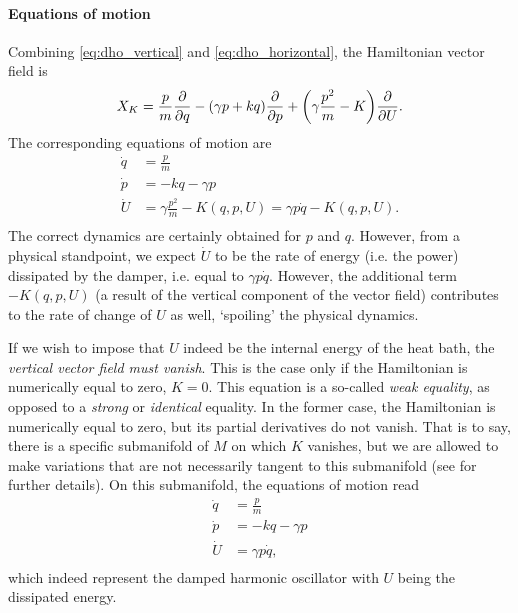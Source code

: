 \paragraph{Equations of motion} Combining \cref{eq:dho_vertical} and \cref{eq:dho_horizontal}, the Hamiltonian vector field is
\begin{equation}
     X_K = \frac{p}{m}\pdv{}{q} - (\gamma p + kq)\pdv{}{p} + \qty(\gamma \frac{p^2}{m} - K)\pdv{}{U}.
\end{equation}
The corresponding equations of motion are 
\begin{equation}
    \begin{split}
        \dot{q} &= \frac{p}{m} \\
        \dot{p} &= -kq -\gamma p \\
        \dot{U} &= \gamma \frac{p^2}{m} - K(q, p, U) = \gamma p\dot{q} - K(q, p, U). \\
    \end{split}
\end{equation}
The correct dynamics are certainly obtained for \(p\) and \(q\). However, from a physical standpoint, we expect \(\dot{U}\) to be the rate of energy (i.e. the power) dissipated by the damper, i.e. equal to \(\gamma p \dot{q}\). However, the additional term \(-K(q, p, U)\) (a result of the vertical component of the vector field) contributes to the rate of change of \(U\) as well, `spoiling' the physical dynamics.

If we wish to impose that \(U\) indeed be the internal energy of the heat bath, the \emph{vertical vector field must vanish}. This is the case only if the Hamiltonian is numerically equal to zero, \(K = 0\). This equation is a so-called \emph{weak equality}, as opposed to a \emph{strong} or \emph{identical} equality. In the former case, the Hamiltonian is numerically equal to zero, but its partial derivatives do not vanish. That is to say, there is a specific submanifold of \(M\) on which \(K\) vanishes, but we are allowed to make variations that are not necessarily tangent to this submanifold (see \citet{Dirac1950} for further details). On this submanifold, the equations of motion read
\begin{equation}
    \begin{split}
        \dot{q} &= \frac{p}{m} \\
        \dot{p} &= -kq -\gamma p \\
        \dot{U} &= \gamma p\dot{q},\\
    \end{split}
\end{equation}
which indeed represent the damped harmonic oscillator with \(U\) being the dissipated energy.

